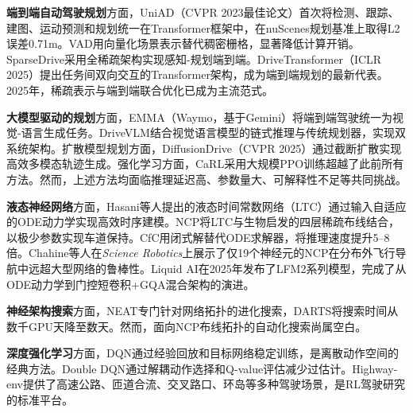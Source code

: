 \xiaosi

\textbf{端到端自动驾驶规划}方面，UniAD\cite{hu2023uniad}（CVPR 2023最佳论文）首次将检测、跟踪、建图、运动预测和规划统一在Transformer框架中，在nuScenes规划基准上取得L2误差0.71m。VAD\cite{jiang2023vad}用向量化场景表示替代稠密栅格，显著降低计算开销。SparseDrive\cite{sun2024sparsedrive}采用全稀疏架构实现感知-规划端到端。DriveTransformer\cite{drivetransformer2025}（ICLR 2025）提出任务间双向交互的Transformer架构，成为端到端规划的最新代表。2025年，稀疏表示与端到端联合优化已成为主流范式。

\textbf{大模型驱动的规划}方面，EMMA\cite{emma2024waymo}（Waymo，基于Gemini）将端到端驾驶统一为视觉-语言生成任务。DriveVLM\cite{tian2024drivevlm}结合视觉语言模型的链式推理与传统规划器，实现双系统架构。扩散模型规划方面，DiffusionDrive\cite{diffusiondrive2025}（CVPR 2025）通过截断扩散实现高效多模态轨迹生成。强化学习方面，CaRL\cite{carl2025}采用大规模PPO训练超越了此前所有方法。然而，上述方法均面临推理延迟高、参数量大、可解释性不足等共同挑战。

\textbf{液态神经网络}方面，Hasani等人\cite{hasani2021ltc}提出的液态时间常数网络（LTC）通过输入自适应的ODE动力学实现高效时序建模。NCP\cite{lechner2020ncp}将LTC与生物启发的四层稀疏布线结合，以极少参数实现车道保持。CfC\cite{hasani2022cfc}用闭式解替代ODE求解器，将推理速度提升5--8倍。Chahine等人\cite{chahine2023robust}在\textit{Science Robotics}上展示了仅19个神经元的NCP在分布外飞行导航中远超大型网络的鲁棒性。Liquid AI在2025年发布了LFM2系列模型\cite{lfm2tech2025}，完成了从ODE动力学到门控短卷积+GQA混合架构的演进。

\textbf{神经架构搜索}方面，NEAT\cite{stanley2002neat}专门针对网络拓扑的进化搜索，DARTS\cite{liu2019darts}将搜索时间从数千GPU天降至数天。然而，面向NCP布线拓扑的自动化搜索尚属空白。

\textbf{深度强化学习}方面，DQN\cite{mnih2015dqn}通过经验回放和目标网络稳定训练，是离散动作空间的经典方法。Double DQN\cite{hasselt2016ddqn}通过解耦动作选择和Q-value评估减少过估计。Highway-env\cite{leurent2018highway}提供了高速公路、匝道合流、交叉路口、环岛等多种驾驶场景，是RL驾驶研究的标准平台。
